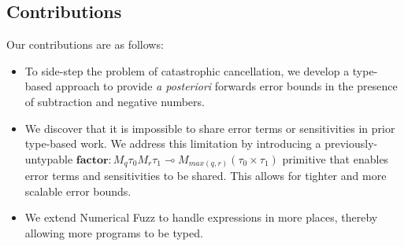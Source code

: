 
\subsection{Contributions}

Our contributions are as follows:
\begin{itemize}
  \item To side-step the problem of catastrophic cancellation, we develop a
    type-based approach to provide \textit{a posteriori} forwards error bounds
    in the presence of subtraction and negative numbers. 

  \item We discover that it is impossible to share error terms or sensitivities
    in prior type-based work. We address this limitation by introducing a
    previously-untypable 
    $\textbf{factor} : M_q \tau_0 M_r \tau_1 \multimap M_{max(q, r)} (\tau_0
    \times \tau_1)$
    primitive that enables error terms and
    sensitivities to be shared. This allows for tighter and more scalable error
    bounds.

  \item We extend Numerical Fuzz to handle expressions in more places, thereby
    allowing more programs to be typed.
\end{itemize}
